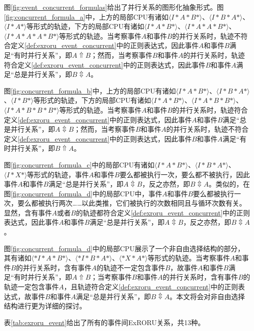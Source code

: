 图\ref{fig:event_concurrent_formulas}给出了并行关系的图形化抽象形式。图\ref{fig:concurrent_formula_a}中，上方的局部CPU有诸如$\langle I*A*B*\rangle$、$\langle I*B*A*\rangle$、$\langle I*A*\rangle$等形式的轨迹，下方的局部CPU有诸如$\langle I*A*B*\rangle$、$\langle I*A*A*B*\rangle$、$\langle I*A*A*A*B*\rangle$等形式的轨迹。当考察事件$A$和事件$B$的并行关系时，轨迹不符合定义\ref{def:exroru_event_concurrent}中的正则表达式，因此事件$A$和事件$B$满足“有时并行关系”，即$A\Uparrow B$；然而，当考察事件$B$和事件$A$的并行关系时，轨迹符合定义\ref{def:exroru_event_concurrent}中的正则表达式，因此事件$B$和事件$A$满足“总是并行关系”，即$B\Updownarrow A$。

图\ref{fig:concurrent_formula_b}中，上方的局部CPU有诸如$\langle I*A*B*\rangle$、$\langle I*B*A*\rangle$、$\langle I*B*\rangle$等形式的轨迹，下方的局部CPU有诸如$\langle I*A*B*\rangle$、$\langle I*A*B*B*\rangle$、$\langle I*A*B*B*B*\rangle$等形式的轨迹。当考察事件$A$和事件$B$的并行关系时，轨迹符合定义\ref{def:exroru_event_concurrent}中的正则表达式，因此事件$A$和事件$B$满足“总是并行关系”，即$A\Updownarrow B$；然而，当考察事件$B$和事件$A$的并行关系时，轨迹不符合定义\ref{def:exroru_event_concurrent}中的正则表达式，因此事件$B$和事件$A$满足“有时并行关系”，即$B\Uparrow A$。

图\ref{fig:concurrent_formula_c}中的局部CPU有诸如$\langle I*A*B*\rangle$、$\langle I*B*A*\rangle$、$\langle I*X*\rangle$等形式的轨迹，事件$A$和事件$B$要么都被执行一次，要么都不被执行，因此事件$A$和事件$B$满足“总是并行关系”，即$A\Updownarrow B$，反之亦然，即$B\Updownarrow A$。类似的，在图\ref{fig:concurrent_formula_d}中的局部CPU中，事件$A$和事件$B$要么都被执行一次，要么都被执行两次……以此类推，它们被执行的次数相同且与循环次数有关。显然，含有事件$A$或者$B$的轨迹都符合定义\ref{def:exroru_event_concurrent}中的正则表达式，因此事件$A$和事件$B$满足“总是并行关系”，即$A\Updownarrow B$，反之亦然，即$B\Updownarrow A$。

图\ref{fig:concurrent_formula_d}中的局部CPU展示了一个非自由选择结构的部分，其有诸如$\langle *I*A*B*\rangle$、$\langle *I*B*A*\rangle$、$\langle *X*A*\rangle$等形式的轨迹。当考察事件$A$和事件$B$的并行关系时，含有事件$A$的轨迹不一定包含事件$B$，故事件$A$和事件$B$满足“有时并行关系”，即$A\Uparrow B$；当考察事件$B$和事件$A$的并行关系时，含有事件$B$的轨迹一定包含事件$A$，且轨迹符合定义\ref{def:exroru_event_concurrent}中的正则表达式，故事件$B$和事件$A$满足“总是并行关系”，即$B\Updownarrow A$。本文将会对非自由选择结构进行更为详细的探讨。

表\ref{tab:exroru_event}给出了所有的事件间ExRORU关系，共13种。

